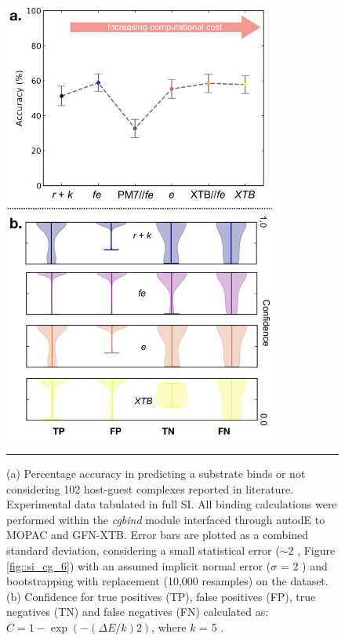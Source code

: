 \documentclass[../../main.tex]{subfiles}
\newcommand{\cgbind}{\emph{cgbind }}
\begin{document}
\begin{figure}[h!]
	\vspace{0.4cm}
	\centering
	\includegraphics[width=9cm]{3/cgbind/figs/fig7}
	\vspace{0.2cm}
	\hrule
	\caption{(a) Percentage accuracy in predicting a substrate binds or not considering 102 host-guest complexes reported in literature. Experimental data tabulated in full SI. All binding calculations were performed within the \cgbind module interfaced through autodE to MOPAC and GFN-XTB. Error bars are plotted as a combined standard deviation, considering a small statistical error ($\sim$2 \kcal, Figure \ref{fig::si_cg_6}) with an assumed implicit normal error ($\sigma$ = 2 \kcal) and bootstrapping with replacement (10,000 resamples) on the dataset. (b) Confidence for true positives (TP), false positives (FP), true negatives (TN) and false negatives (FN) calculated as: $C = 1 - \exp(-(\Delta E/k)2)$, where $k$ = 5 \kcal.}
	\label{fig::cg_7}
\end{figure}

\clearpage
\end{document}
